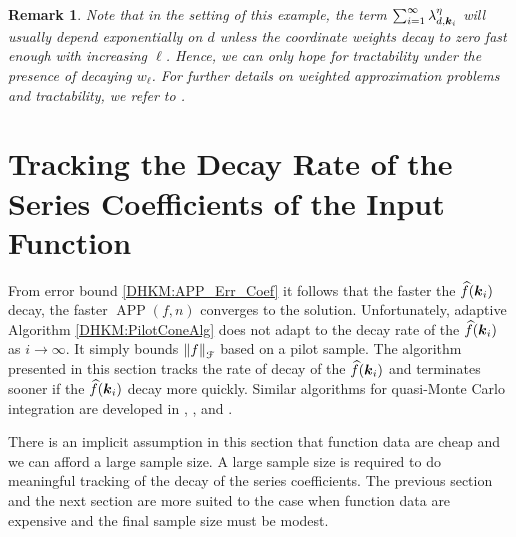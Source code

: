 \documentclass[USenglish]{article}
\theoremstyle{dgthm}
\theoremstyle{dgthm}
\theoremstyle{dgthm}
\theoremstyle{dgthm}
\theoremstyle{dgdef}
\newtheorem{remark}{Remark}
\theoremstyle{definition}
\DeclareMathOperator{\APP}{APP}
\newcommand{\hf}{\widehat{f}}
\newcommand{\norm}[2][{}]{\ensuremath{\left \lVert #2 \right \rVert}_{#1}}
\begin{document}
\begin{remark}
Note that in the setting of this example, the term 
$\sum_{i=1}^{\infty}\lambda_{d, {\boldsymbol{k}}_{i}}^{\eta}$ will usually depend exponentially on $d$ unless the 
coordinate weights decay to zero fast enough with increasing $\ell$. Hence, we can only hope for tractability under the presence of decaying $w_\ell$. For further details on weighted approximation
problems and tractability, we refer to \cite{NovWoz08a}.
\end{remark}


\section{Tracking the Decay Rate of the Series Coefficients of the Input Function}
\label{DHKM:tracking_sec} 


From error bound \eqref{DHKM:APP_Err_Coef} it follows that the faster the $\hf(\bsk_i)$ decay, the faster $\APP(f,n)$ converges to the solution.  Unfortunately, adaptive Algorithm \ref{DHKM:PilotConeAlg} does not adapt to the decay rate of the $\hf(\bsk_i)$ as $i \to \infty$. It simply bounds $\norm[\calF]{f}$ based on a pilot sample.  The algorithm presented in this section tracks the rate of decay of the $\hf(\bsk_i)$ and terminates sooner if the $\hf(\bsk_i)$ decay more quickly.  Similar algorithms for quasi-Monte Carlo integration are developed in \cite{HicJim16a}, \cite{JimHic16a}, and \cite{HicEtal17a}.

There is an implicit assumption in this section that function data are cheap and we can afford a large sample size.  A large sample size is required to do meaningful tracking of the decay of the series coefficients.  The previous section and the next section are more suited to the case when function data are expensive and the final sample size must be modest.
\end{document}
